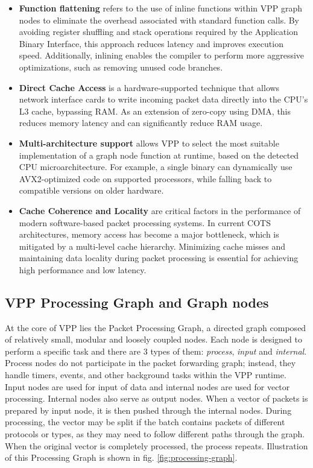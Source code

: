 \begin{itemize}
  \item \textbf{Function flattening} refers to the use of inline functions within VPP graph nodes to eliminate the overhead associated with standard function calls.
By avoiding register shuffling and stack operations required by the Application Binary Interface, this approach reduces latency and improves execution speed.
Additionally, inlining enables the compiler to perform more aggressive optimizations, such as removing unused code branches.~\cite{LINGUAGLOSSA}

  \item \textbf{Direct Cache Access} is a hardware-supported technique that allows network interface cards to write incoming packet data directly into the CPU’s L3 cache, bypassing RAM. 
As an extension of zero-copy using DMA, this reduces memory latency and can significantly reduce RAM usage.~\cite{LINGUAGLOSSA}

  \item \textbf{Multi-architecture support} allows VPP to select the most suitable implementation of a graph node function at runtime, based on the detected CPU microarchitecture.
For example, a single binary can dynamically use AVX2-optimized code on supported processors, while falling back to compatible versions on older hardware.~\cite{LINGUAGLOSSA}
  
  \item \textbf{Cache Coherence and Locality} are critical factors in the performance of modern software-based packet processing systems. 
In current COTS architectures, memory access has become a major bottleneck, which is mitigated by a multi-level cache hierarchy.
Minimizing cache misses and maintaining data locality during packet processing is essential for achieving high performance and low latency.~\cite{LINGUAGLOSSA}

\end{itemize}

\subsection{VPP Processing Graph and Graph nodes}
At the core of VPP lies the Packet Processing Graph, a directed graph composed of relatively small, modular and loosely coupled nodes. 
Each node is designed to perform a specific task and there are 3 types of them: \textit{process}, \textit{input} and \textit{internal}. 
Process nodes do not participate in the packet forwarding graph; instead, they handle timers, events, and other background tasks within the VPP runtime.
Input nodes are used for input of data and internal nodes are used for vector processing. Internal nodes also serve as output nodes. 
When a vector of packets is prepared by input node, it is then pushed through the internal nodes. 
During processing, the vector may be split if the batch contains packets of different protocols or types, as they may need to follow different paths through the graph.
When the original vector is completely processed, the process repeats.
Illustration of this Processing Graph is shown in fig. \ref{fig:processing-graph}.

